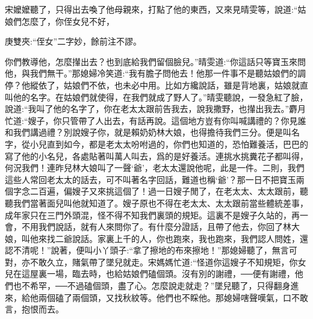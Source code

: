 \begin{parag}
    宋嬤嬤聽了，只得出去喚了他母親來，打點了他的東西，又來見晴雯等，說道:“姑娘們怎麼了，你侄女兒不好，\begin{note}庚雙夾:“侄女”二字妙，餘前注不謬。\end{note}你們教導他，怎麼攆出去？也到底給我們留個臉兒。”晴雯道:“你這話只等寶玉來問他，與我們無干。”那媳婦冷笑道:“我有膽子問他去！他那一件事不是聽姑娘們的調停？他縱依了，姑娘們不依，也未必中用。比如方纔說話，雖是背地裏，姑娘就直叫他的名字。在姑娘們就使得，在我們就成了野人了。”晴雯聽說，一發急紅了臉，說道:“我叫了他的名字了，你在老太太跟前告我去，說我撒野，也攆出我去。”麝月忙道:“嫂子，你只管帶了人出去，有話再說。這個地方豈有你叫喊講禮的？你見誰和我們講過禮？別說嫂子你，就是賴奶奶林大娘，也得擔待我們三分。便是叫名字，從小兒直到如今，都是老太太吩咐過的，你們也知道的，恐怕難養活，巴巴的寫了他的小名兒，各處貼著叫萬人叫去，爲的是好養活。連挑水挑糞花子都叫得，何況我們！連昨兒林大娘叫了一聲‘爺’，老太太還說他呢，此是一件。二則，我們這些人常回老太太的話去，可不叫著名字回話，難道也稱‘爺’？那一日不把寶玉兩個字念二百遍，偏嫂子又來挑這個了！過一日嫂子閒了，在老太太、太太跟前，聽聽我們當著面兒叫他就知道了。嫂子原也不得在老太太、太太跟前當些體統差事，成年家只在三門外頭混，怪不得不知我們裏頭的規矩。這裏不是嫂子久站的，再一會，不用我們說話，就有人來問你了。有什麼分證話，且帶了他去，你回了林大娘，叫他來找二爺說話。家裏上千的人，你也跑來，我也跑來，我們認人問姓，還認不清呢！”說著，便叫小丫頭子:“拿了擦地的布來擦地！”那媳婦聽了，無言可對，亦不敢久立，賭氣帶了墜兒就走。宋媽媽忙道:“怪道你這嫂子不知規矩，你女兒在這屋裏一場，臨去時，也給姑娘們磕個頭。沒有別的謝禮，──便有謝禮，他們也不希罕，──不過磕個頭，盡了心。怎麼說走就走？”墜兒聽了，只得翻身進來，給他兩個磕了兩個頭，又找秋紋等。他們也不睬他。那媳婦嗐聲嘆氣，口不敢言，抱恨而去。
\end{parag}


